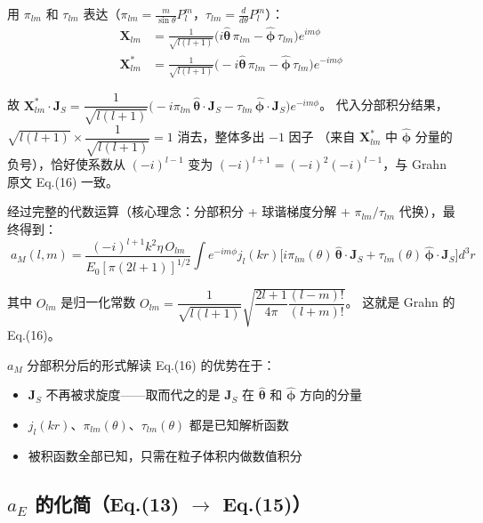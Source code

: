 用 $\pi_{lm}$ 和 $\tau_{lm}$ 表达（$\pi_{lm}=\frac{m}{\sin\theta}P_l^m$，$\tau_{lm}=\frac{d}{d\theta}P_l^m$）：
\begin{align}
  \mathbf{X}_{lm} &= \frac{1}{\sqrt{l(l+1)}}\bigl(i\hat{\boldsymbol{\theta}}\,\pi_{lm} - \hat{\boldsymbol{\phi}}\,\tau_{lm}\bigr)e^{im\phi} \\
  \mathbf{X}_{lm}^* &= \frac{1}{\sqrt{l(l+1)}}\bigl(-i\hat{\boldsymbol{\theta}}\,\pi_{lm} - \hat{\boldsymbol{\phi}}\,\tau_{lm}\bigr)e^{-im\phi}
\end{align}

故 $\mathbf{X}_{lm}^*\cdot\mathbf{J}_S = \dfrac{1}{\sqrt{l(l+1)}}\bigl(-i\pi_{lm}\,\hat{\boldsymbol{\theta}}\cdot\mathbf{J}_S
- \tau_{lm}\,\hat{\boldsymbol{\phi}}\cdot\mathbf{J}_S\bigr)e^{-im\phi}$。
代入分部积分结果，$\sqrt{l(l+1)}\times\dfrac{1}{\sqrt{l(l+1)}}=1$ 消去，整体多出 $-1$ 因子
（来自 $\mathbf{X}_{lm}^*$ 中 $\hat{\boldsymbol{\phi}}$ 分量的负号），恰好使系数从
$(-i)^{l-1}$ 变为 $(-i)^{l+1}=(-i)^2(-i)^{l-1}$，与 Grahn 原文 Eq.(16) 一致。

经过完整的代数运算（核心理念：分部积分 + 球谐梯度分解 + $\pi_{lm}/\tau_{lm}$ 代换），最终得到：
\begin{equation}
  \boxed{\;
    a_M(l,m) = \frac{(-i)^{l+1}k^2\eta\,O_{lm}}{E_0[\pi(2l+1)]^{1/2}}
    \int e^{-im\phi} j_l(kr)\bigl[
      i\pi_{lm}(\theta)\,\hat{\boldsymbol{\theta}}\cdot\mathbf{J}_S
      + \tau_{lm}(\theta)\,\hat{\boldsymbol{\phi}}\cdot\mathbf{J}_S
    \bigr] d^3r
    \;}
  \label{eq:aM_final}
\end{equation}

其中 $O_{lm}$ 是归一化常数
$O_{lm} = \dfrac{1}{\sqrt{l(l+1)}}\sqrt{\dfrac{2l+1}{4\pi}\dfrac{(l-m)!}{(l+m)!}}$。
这就是 Grahn 的 Eq.(16)。

\begin{stepbox}{$a_M$ 分部积分后的形式解读}
Eq.(16) 的优势在于：
\begin{itemize}
  \item $\mathbf{J}_S$ 不再被求旋度——取而代之的是 $\mathbf{J}_S$ 在 $\hat{\boldsymbol{\theta}}$ 和 $\hat{\boldsymbol{\phi}}$ 方向的分量
  \item $j_l(kr)$、$\pi_{lm}(\theta)$、$\tau_{lm}(\theta)$ 都是已知解析函数
  \item 被积函数全部已知，只需在粒子体积内做数值积分
\end{itemize}
\end{stepbox}

\subsection{$a_E$ 的化简（Eq.(13) $\to$ Eq.(15)）}

